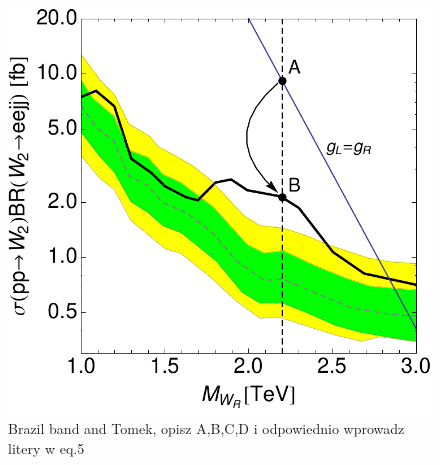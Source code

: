 \documentclass[twocolumn,superscriptaddress,showpacs,prl,nofootinbib,floatfix]{revtex4}
\begin{document}



\begin{figure}
\begin{center}
\includegraphics[scale=0.6]{CMS-ppeejj-4}
\caption{Brazil band and  Tomek, opisz A,B,C,D i odpowiednio wprowadz litery w eq.5}   \label{meg2}
\end{center}
\end{figure}
 
\end{document}
